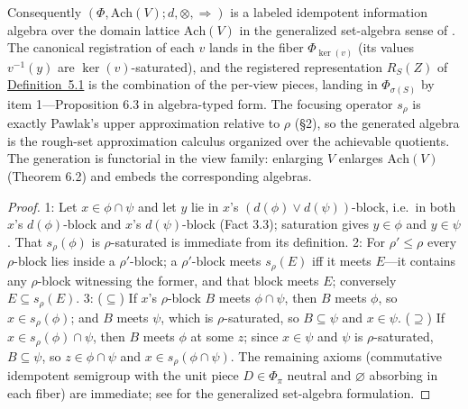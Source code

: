 \begin{thmplain}
Consequently \((\Phi, \mathrm{Ach}(V); d, \otimes, \Rightarrow)\) is a labeled idempotent information algebra over the domain lattice \(\mathrm{Ach}(V)\) in the generalized set-algebra sense of \autocite{kohlas2017}. The canonical registration of each \(v\) lands in the fiber \(\Phi_{\ker(v)}\) (its values \(v^{-1}(y)\) are \(\ker(v)\)-saturated), and the registered representation \(R_S(Z)\) of \hyperlink{stmt:5.1}{Definition~5.1} is the combination of the per-view pieces, landing in \(\Phi_{\sigma(S)}\) by item 1---\hspace{0pt}Proposition 6.3 in algebra-typed form. The focusing operator \(s_\rho\) is exactly Pawlak's upper approximation relative to \(\rho\) (§2), so the generated algebra is the rough-set approximation calculus organized over the achievable quotients. The generation is functorial in the view family: enlarging \(V\) enlarges \(\mathrm{Ach}(V)\) (Theorem 6.2) and embeds the corresponding algebras.
\end{thmplain}

\begin{proof}

1: Let \(x \in \phi \cap \psi\) and let \(y\) lie in \(x\)'s \((d(\phi) \vee d(\psi))\)-block, i.e.~in both \(x\)'s \(d(\phi)\)-block and \(x\)'s \(d(\psi)\)-block (Fact 3.3); saturation gives \(y \in \phi\) and \(y \in \psi\). That \(s_\rho(\phi)\) is \(\rho\)-saturated is immediate from its definition. 2: For \(\rho' \le \rho\) every \(\rho\)-block lies inside a \(\rho'\)-block; a \(\rho'\)-block meets \(s_\rho(E)\) iff it meets \(E\)---\hspace{0pt}it contains any \(\rho\)-block witnessing the former, and that block meets \(E\); conversely \(E \subseteq s_\rho(E)\). 3: (\(\subseteq\)) If \(x\)'s \(\rho\)-block \(B\) meets \(\phi \cap \psi\), then \(B\) meets \(\phi\), so \(x \in s_\rho(\phi)\); and \(B\) meets \(\psi\), which is \(\rho\)-saturated, so \(B \subseteq \psi\) and \(x \in \psi\). (\(\supseteq\)) If \(x \in s_\rho(\phi) \cap \psi\), then \(B\) meets \(\phi\) at some \(z\); since \(x \in \psi\) and \(\psi\) is \(\rho\)-saturated, \(B \subseteq \psi\), so \(z \in \phi \cap \psi\) and \(x \in s_\rho(\phi \cap \psi)\). The remaining axioms (commutative idempotent semigroup with the unit piece \(D \in \Phi_\pi\) neutral and \(\varnothing\) absorbing in each fiber) are immediate; see \autocite{kohlas2017} for the generalized set-algebra formulation.
\end{proof}


